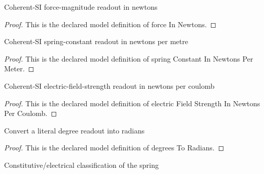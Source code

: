 \begin{definition}
  \label{def:physics:phyx-mini-0891:phyxminiproblems-problemphyxmini0891-forceinnewtons}
  Coherent-SI force-magnitude readout in newtons
\end{definition}
\begin{proof}
  This is the declared model definition of force In Newtons.
\end{proof}
\begin{definition}
  \label{def:physics:phyx-mini-0891:phyxminiproblems-problemphyxmini0891-springconstantinnewtonspermeter}
  Coherent-SI spring-constant readout in newtons per metre
\end{definition}
\begin{proof}
  This is the declared model definition of spring Constant In Newtons Per Meter.
\end{proof}
\begin{definition}
  \label{def:physics:phyx-mini-0891:phyxminiproblems-problemphyxmini0891-electricfieldstrengthinnewtonspercoulomb}
  Coherent-SI electric-field-strength readout in newtons per coulomb
\end{definition}
\begin{proof}
  This is the declared model definition of electric Field Strength In Newtons Per Coulomb.
\end{proof}
\begin{definition}
  \label{def:physics:phyx-mini-0891:phyxminiproblems-problemphyxmini0891-degreestoradians}
  Convert a literal degree readout into radians
\end{definition}
\begin{proof}
  This is the declared model definition of degrees To Radians.
\end{proof}
\begin{definition}
  \label{def:physics:phyx-mini-0891:phyxminiproblems-problemphyxmini0891-springmaterial}
  Constitutive/electrical classification of the spring
\end{definition}
